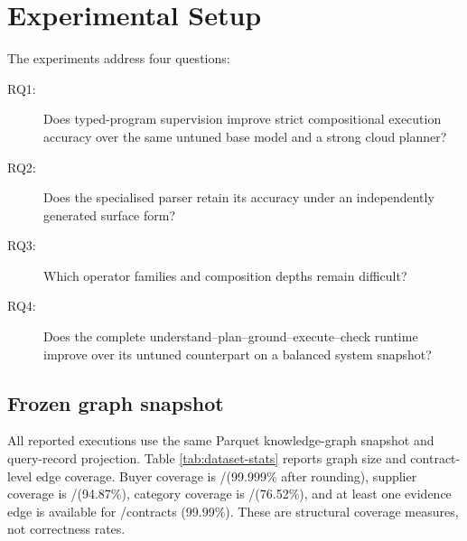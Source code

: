 \section{Experimental Setup}
\label{sec:experiments}

The experiments address four questions:
\begin{description}
  \item[RQ1:] Does typed-program supervision improve strict compositional execution accuracy
  over the same untuned base model and a strong cloud planner?
  \item[RQ2:] Does the specialised parser retain its accuracy under an independently generated
  surface form?
  \item[RQ3:] Which operator families and composition depths remain difficult?
  \item[RQ4:] Does the complete understand--plan--ground--execute--check runtime improve over its
  untuned counterpart on a balanced system snapshot?
\end{description}

\subsection{Frozen graph snapshot}

All reported executions use the same Parquet knowledge-graph snapshot and query-record
projection.  Table \ref{tab:dataset-stats} reports graph size and contract-level edge coverage.
Buyer coverage is \KGBuyerCoverage/\KGContracts (99.999\% after rounding), supplier coverage is
\KGSupplierCoverage/\KGContracts (94.87\%), category coverage is
\KGCategoryCoverage/\KGContracts (76.52\%), and at least one evidence edge is available for
\KGEvidenceCoverage/\KGContracts contracts (99.99\%).  These are structural coverage measures,
not correctness rates.

